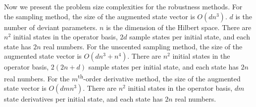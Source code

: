 Now we present the problem size complexities for the robustness methods.
For the sampling method, the size of the augmented state vector
is $O(dn^{3})$. $d$ is the number of deviant parameters.
$n$ is the dimension of the Hilbert space. There are $n^{2}$ initial states
in the operator basis, $2d$ sample states per initial state,
and each state has $2n$ real numbers.
For the unscented sampling method, the size of the augmented state vector
is $O(dn^{3} + n^{4})$.
There are $n^{2}$ initial states in the operator basis,
$2(2n + d)$ sample states per initial state,
and each state has $2n$ real numbers.
For the $m$\textsuperscript{th}-order derivative method, the size of the augmented state vector
is $O(dmn^{3})$. There are $n^{2}$
initial states in the operator basis, $dm$ state derivatives per initial state,
and each state has $2n$ real numbers.
